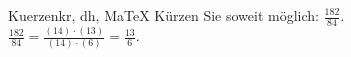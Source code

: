 \begin{MAufgabe}{Kuerzen}{kr, dh, MaTeX}
K\"urzen Sie soweit m\"oglich: $\frac{182}{84}$.\\ 
\ifLsg\MLoesung
\quad $\frac{182}{84}=\frac{(14)\cdot(13)}{(14)\cdot(6)}=\frac{13}{6}$.\else\relax\fi
 \end{MAufgabe}